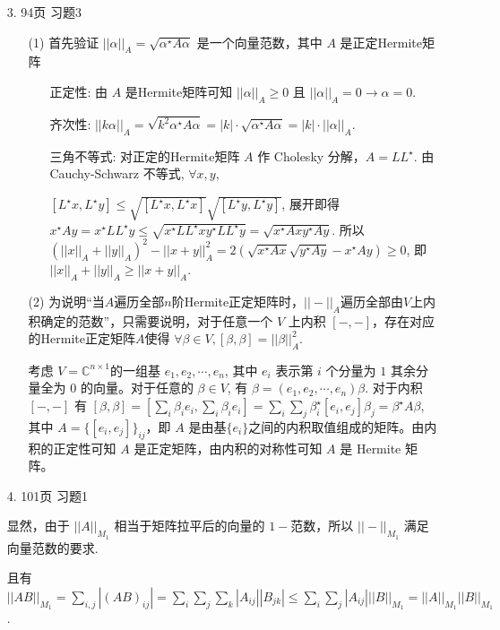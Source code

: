 \documentclass{article}
\begin{document}
\begin{spacing}{1.5}
\begin{enumerate}
    \item [3.] 94页 习题3
    
    \begin{itemize}
        \item [(1)] 首先验证 $||\alpha||_A = \sqrt{\alpha^\star A\alpha}$ 是一个向量范数，其中 $A$ 是正定Hermite矩阵
        \begin{itemize}
            \item [正定性:] 由 $A$ 是Hermite矩阵可知 $||\alpha||_A\geq 0$ 且 $||\alpha||_A = 0 \rightarrow \alpha = 0$.
            \item [齐次性:] $||k\alpha||_A = \sqrt{k^2\alpha^\star A\alpha} = |k|\cdot\sqrt{\alpha^\star A\alpha} = |k|\cdot||\alpha||_A$.
            \item [三角不等式:] 对正定的Hermite矩阵 $A$ 作 Cholesky 分解，$A = LL^\star$. 由 Cauchy-Schwarz 不等式, $\forall x, y$,
            
            $[L^\star x, L^\star y] \leq \sqrt{[L^\star x, L^\star x]}\sqrt{[L^\star y, L^\star y]}$, 展开即得 $x^\star Ay = x^\star LL^\star y \leq \sqrt{x^\star LL^\star x y^\star LL^\star y}=\sqrt{x^\star Axy^\star Ay}$. 所以 $(||x||_A + ||y||_A)^2 - ||x+y||_A^2 = 2\left(\sqrt{x^\star Ax}\sqrt{y^\star Ay} - x^\star Ay\right) \geq 0$, 即 $||x||_A + ||y||_A \geq ||x + y||_A$.
        \end{itemize}
        \item [(2)] 为说明“当$A$遍历全部$n$阶Hermite正定矩阵时，$||-||_A$遍历全部由$V$上内积确定的范数”，只需要说明，对于任意一个 $V$ 上内积 $[-,-]$，存在对应的Hermite正定矩阵$A$使得 $\forall \beta\in V, [\beta, \beta] = ||\beta||_A^2$.
        
        考虑 $V=\mathbb{C}^{n\times 1}$的一组基 $e_1, e_2, \cdots, e_n$, 其中 $e_i$ 表示第 $i$ 个分量为 $1$ 其余分量全为 $0$ 的向量。对于任意的 $\beta \in V$, 有 $\beta = (e_1, e_2, \cdots, e_n)\beta$. 对于内积 $[-, -]$ 有 $[\beta, \beta] = [\sum_{i}\beta_ie_i, \sum_{i}\beta_ie_i]=\sum_{i}\sum_{j}\beta_i^\star [e_i, e_j] \beta_j = \beta^\star A\beta$, 其中 $A = \{[e_i, e_j]\}_{ij}$，即 $A$ 是由基$\{e_i\}$之间的内积取值组成的矩阵。由内积的正定性可知 $A$ 是正定矩阵，由内积的对称性可知 $A$ 是 Hermite 矩阵。
    \end{itemize}

    \item [4.] 101页 习题1 
    
    显然，由于 $||A||_{M_1}$ 相当于矩阵拉平后的向量的 $1-$范数，所以 $||-||_{M_1}$  满足向量范数的要求. 
    
    且有 $||AB||_{M_1} = \sum_{i,j} |(AB)_{ij}| = \sum_i\sum_j\sum_k |A_{ij}||B_{jk}| \leq \sum_{i}\sum_{j} |A_{ij}|||B||_{M_1} = ||A||_{M_1} ||B||_{M_1}$.


\end{enumerate}
\end{spacing}
\end{document}
